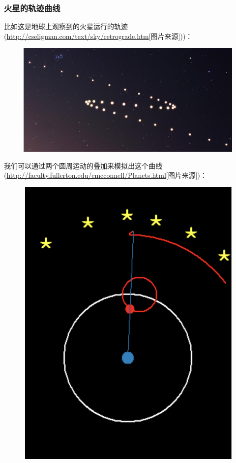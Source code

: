 \documentclass[12pt]{article}
\begin{document}
\subsubsection{火星的轨迹曲线}
比如这是地球上观察到的火星运行的轨迹(\url{http://cseligman.com/text/sky/retrograde.htm}[图片来源]))：
\begin{figure}[H]
  \centering
  \includegraphics[width=.8\textwidth]{fig/mars_orbit.jpeg} 
\end{figure}
我们可以通过两个圆周运动的叠加来模拟出这个曲线(\url{http://faculty.fullerton.edu/cmcconnell/Planets.html}[图片来源])：
\begin{figure}[H]
  \centering
  \includegraphics[width=.8\textwidth]{fig/mars_orbit_explanation.png} 
\end{figure}
\end{document}
